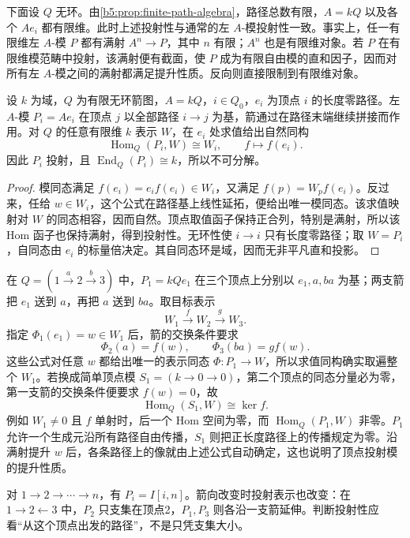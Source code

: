 下面设 \(Q\) 无环。由\cref{b5:prop:finite-path-algebra}，路径总数有限，\(A=kQ\) 以及各个 \(Ae_i\) 都有限维。此时上述投射性与通常的左 \(A\)-模投射性一致。事实上，任一有限维左 \(A\)-模 \(P\) 都有满射 \(A^n\to P\)，其中 \(n\) 有限；\(A^n\) 也是有限维对象。若 \(P\) 在有限维模范畴中投射，该满射便有截面，使 \(P\) 成为有限自由模的直和因子，因而对所有左 \(A\)-模之间的满射都满足提升性质。反向则直接限制到有限维对象。
\begin{proposition}\label{b5:prop:vertex-projective}
	设 \(k\) 为域，\(Q\) 为有限无环箭图，\(A=kQ\)，\(i\in Q_0\)，\(e_i\) 为顶点 \(i\) 的长度零路径。左 \(A\)-模 \(P_i=Ae_i\) 在顶点 \(j\) 以全部路径 \(i\to j\) 为基，箭通过在路径末端继续拼接而作用。对 \(Q\) 的任意有限维 \(k\) 表示 \(W\)，在 \(e_i\) 处求值给出自然同构
	\[
		\operatorname{Hom}_Q(P_i,W)\cong W_i,\qquad f\longmapsto f(e_i).
	\]
	因此 \(P_i\) 投射，且 \(\operatorname{End}_Q(P_i)\cong k\)，所以不可分解。
\end{proposition}
\begin{proof}
	模同态满足 \(f(e_i)=e_if(e_i)\in W_i\)，又满足 \(f(p)=W_p f(e_i)\)。反过来，任给 \(w\in W_i\)，这个公式在路径基上线性延拓，便给出唯一模同态。该求值映射对 \(W\) 的同态相容，因而自然。顶点取值函子保持正合列，特别是满射，所以该 Hom 函子也保持满射，得到投射性。无环性使 \(i\to i\) 只有长度零路径；取 \(W=P_i\)，自同态由 \(e_i\) 的标量倍决定。其自同态环是域，因而无非平凡直和投影。
\end{proof}
在 \(Q=(1\xrightarrow{a}2\xrightarrow{b}3)\) 中，\(P_1=kQe_1\) 在三个顶点上分别以 \(e_1,a,ba\) 为基；两支箭把 \(e_1\) 送到 \(a\)，再把 \(a\) 送到 \(ba\)。取目标表示
\[
	W_1\xrightarrow{f}W_2\xrightarrow{g}W_3.
\]
指定 \(\Phi_1(e_1)=w\in W_1\) 后，箭的交换条件要求
\[
	\Phi_2(a)=f(w),\qquad \Phi_3(ba)=gf(w).
\]
这些公式对任意 \(w\) 都给出唯一的表示同态 \(\Phi:P_1\to W\)，所以求值同构确实取遍整个 \(W_1\)。若换成简单顶点模 \(S_1=(k\to0\to0)\)，第二个顶点的同态分量必为零，第一支箭的交换条件便要求 \(f(w)=0\)，故
\[
	\operatorname{Hom}_Q(S_1,W)\cong\ker f.
\]
例如 \(W_1\ne0\) 且 \(f\) 单射时，后一个 Hom 空间为零，而 \(\operatorname{Hom}_Q(P_1,W)\) 非零。\(P_1\) 允许一个生成元沿所有路径自由传播，\(S_1\) 则把正长度路径上的传播规定为零。沿满射提升 \(w\) 后，各条路径上的像就由上述公式自动确定，这也说明了顶点投射模的提升性质。

\ProseParagraphBreak

对 \(1\to2\to\cdots\to n\)，有 \(P_i=I[i,n]\)。箭向改变时投射表示也改变：在 \(1\to2\leftarrow3\) 中，\(P_2\) 只支集在顶点2，\(P_1,P_3\) 则各沿一支箭延伸。判断投射性应看“从这个顶点出发的路径”，不是只凭支集大小。

